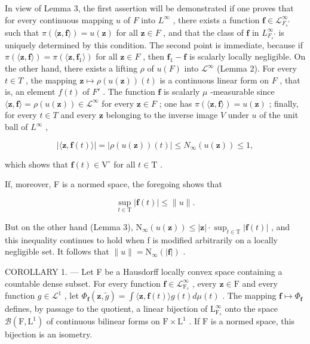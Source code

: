 In view of Lemma 3, the first assertion will be demonstrated if one proves that for every continuous mapping \(u\) of \(F\) into \(L^{\infty}\) , there exists a function \(\mathbf{f} \in \mathcal{L}_{F_s'}^{\infty}\) such that \(\pi(\langle \mathbf{z}, \mathbf{f} \rangle) = u(\mathbf{z})\) for all \(\mathbf{z} \in F\) , and that the class of \(\mathbf{f}\) in \(L_{F_s'}^{\infty}\) is uniquely determined by this condition. The second point is immediate, because if \(\pi(\langle \mathbf{z}, \mathbf{f} \rangle) = \pi(\langle \mathbf{z}, \mathbf{f}_1 \rangle)\) for all \(\mathbf{z} \in F\) , then \(\mathbf{f}_1 - \mathbf{f}\) is scalarly locally negligible. On the other hand, there exists a lifting \(\rho\) of \(u(F)\) into \(\mathcal{L}^{\infty}\) (Lemma 2). For every \(t \in T\) , the mapping \(\mathbf{z} \mapsto \rho(u(\mathbf{z}))(t)\) is a continuous linear form on \(F\) , that is, an element \(f(t)\) of \(F'\) . The function \(\mathbf{f}\) is scalarly \(\mu\) -measurable since \(\langle \mathbf{z}, \mathbf{f} \rangle = \rho(u(\mathbf{z})) \in \mathcal{L}^{\infty}\) for every \(\mathbf{z} \in F\) ; one has \(\pi(\langle \mathbf{z}, \mathbf{f} \rangle) = u(\mathbf{z})\) ; finally, for every \(t \in T\) and every \(\mathbf{z}\) belonging to the inverse image \(V\) under \(u\) of the unit ball of \(L^{\infty}\) ,

\[
\left| \langle \mathbf {z}, \mathbf {f} (t) \rangle \right| = \left| \rho (u (\mathbf {z})) (t) \right| \leqslant N _ {\infty} (u (\mathbf {z})) \leqslant 1,
\]

which shows that \(\mathbf{f}(t) \in \mathrm{V}^{\circ}\) for all \(t \in \mathrm{T}\) .

If, moreover, F is a normed space, the foregoing shows that

\[
\sup _ {t \in \mathrm{T}} | \mathbf {f} (t) | \leqslant \| u \|.
\]

But on the other hand (Lemma 3), \(\mathrm{N}_{\infty}(u(\mathbf{z})) \leqslant |\mathbf{z}| \cdot \sup_{t \in \mathrm{T}} |\mathbf{f}(t)|\) , and this inequality continues to hold when f is modified arbitrarily on a locally negligible set. It follows that \(\|u\| = \mathrm{N}_{\infty}(|\mathbf{f}|)\) .

COROLLARY 1. --- Let F be a Hausdorff locally convex space containing a countable dense subset. For every function \(\mathbf{f} \in \mathcal{L}_{\mathrm{F}_s}^\infty\) , every \(\mathbf{z} \in \mathrm{F}\) and every function \(g \in \mathcal{L}^1\) , let \(\Phi_{\mathbf{f}}(\mathbf{z}, \widetilde{g}) = \int \langle \mathbf{z}, \mathbf{f}(t) \rangle g(t) d\mu(t)\) . The mapping \(\mathbf{f} \mapsto \Phi_{\mathbf{f}}\) defines, by passage to the quotient, a linear bijection of \(\mathrm{L}_{\mathrm{F}_s}^\infty\) onto the space \(\mathcal{B}(\mathrm{F}, \mathrm{L}^1)\) of continuous bilinear forms on \(\mathrm{F} \times \mathrm{L}^1\) . If \(\mathrm{F}\) is a normed space, this bijection is an isometry.

